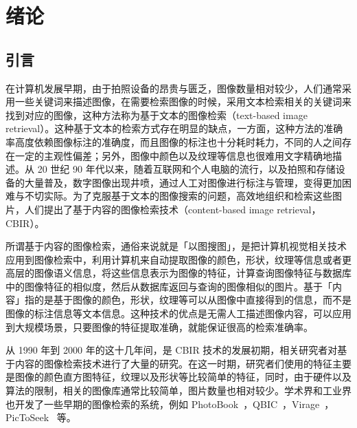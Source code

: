 
\chapter{绪论}
\label{Chapter_introduction}

\section{引言}
在计算机发展早期，由于拍照设备的昂贵与匮乏，图像数量相对较少，人们通常采用一些关键词来描述图像，在需要检索图像的时候，采用文本检索相关的关键词来找到对应的图像，这种方法称为基于文本的图像检索（text-based image retrieval）。这种基于文本的检索方式存在明显的缺点，一方面，这种方法的准确率高度依赖图像标注的准确度，而且图像的标注也十分耗时耗力，不同的人之间存在一定的主观性偏差；另外，图像中颜色以及纹理等信息也很难用文字精确地描述。从 20 世纪 90 年代以来，随着互联网和个人电脑的流行，以及拍照和存储设备的大量普及，数字图像出现井喷，通过人工对图像进行标注与管理，变得更加困难与不切实际。为了克服基于文本的图像搜索的问题，高效地组织和检索这些图片，人们提出了基于内容的图像检索技术（content-based image retrieval，CBIR）。

所谓基于内容的图像检索，通俗来说就是「以图搜图」，是把计算机视觉相关技术应用到图像检索中，利用计算机来自动提取图像的颜色，形状，纹理等信息或者更高层的图像语义信息，将这些信息表示为图像的特征，计算查询图像特征与数据库中的图像特征的相似度，然后从数据库返回与查询的图像相似的图片。基于「内容」指的是基于图像的颜色，形状，纹理等可以从图像中直接得到的信息，而不是图像的标注信息等文本信息。这种技术的优点是无需人工描述图像内容，可以应用到大规模场景，只要图像的特征提取准确，就能保证很高的检索准确率。

从 1990 年到 2000 年的这十几年间，是 CBIR 技术的发展初期，相关研究者对基于内容的图像检索技术进行了大量的研究。在这一时期，研究者们使用的特征主要是图像的颜色直方图特征，纹理以及形状等比较简单的特征，同时，由于硬件以及算法的限制，相关的图像库通常比较简单，图片数量也相对较少。学术界和工业界也开发了一些早期的图像检索的系统，例如 PhotoBook~\cite{Pentland1996PhotobookCM}，QBIC~\cite{Niblack1993TheQP}，Virage~\cite{Bach1996VirageIS}，PicToSeek~\cite{Gevers2000PicToSeekCC} 等。

